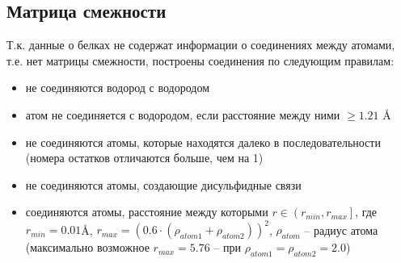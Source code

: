 \documentclass[12pt,twosides]{article}
\begin{document}
	\subsection{Матрица смежности}
	Т.к. данные о белках не содержат информации о соединениях между атомами, т.е. нет матрицы смежности, построены соединения по следующим правилам:
	\begin{itemize}
		\item не соединяются водород с водородом 
		\item атом не соединяется с водородом, если расстояние между ними $\geq 1.21$ \AA
		\item не соединяются атомы, которые находятся далеко в последовательности (номера остатков отличаются больше, чем на 1)
		\item не соединяются атомы, создающие дисульфидные связи
		\item соединяются атомы, расстояние между которыми $r\in \left(r_{min}, r_{max}\right]$, где $r_{min} = 0.01$\AA, $r_{max} = \left(0.6\cdot(\rho_{atom1}+\rho_{atom2})\right)^2$, $\rho_{atom}$ -- радиус атома (максимально возможное $r_{max} = 5.76$ -- при $\rho_{atom1} = \rho_{atom2} = 2.0$)
	\end{itemize}
	
\end{document}

